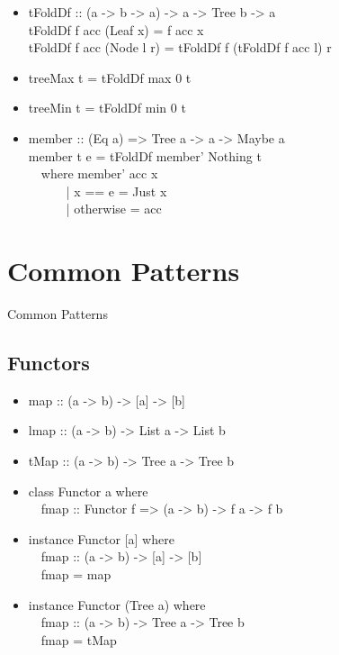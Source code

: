 \documentclass{beamer}                  %
\newcommand{\srule}{
	\rule{\textwidth}{1pt}\\
}
\newlength{\subsecwidth}
\newenvironment{slide}{
	\begin{frame} %
	\settowidth{\subsecwidth}{\insertsubsection} %
	\ifthenelse{\dimtest{\subsecwidth}{<}{1pt}}{ %
		\frametitle{\insertsection\\             %
		\vspace{-1ex}                            %
		\color{fore}\srule                       %
		\par                                     %
		\vspace{-3ex}                            %
		}
	}{                                           %
		\frametitle{\insertsection\ -- \insertsubsection\\ %
		\vspace{-1ex}                            %
		\color{fore}\srule                       %
		\par                                     %
		\vspace{-3ex}                            %
		}
	}
	\Large                                       %
}{
	\end{frame}
}
\newcommand{\titleslide}[1]{
	\section{#1}             %
	\begin{slide}
		\begin{center}
			\color{comments}
			\Huge            %
			#1               %
		\end{center}
	\end{slide}
}
\begin{document}
\begin{slide}
  \begin{itemize}
    \item
      tFoldDf :: (a -> b -> a) -> a -> Tree b -> a\\
      tFoldDf f acc (Leaf x)   = f acc x\\
      tFoldDf f acc (Node l r) = tFoldDf f (tFoldDf f acc l) r
    \item treeMax t = tFoldDf max 0 t
    \item treeMin t = tFoldDf min 0 t
  \end{itemize}
\end{slide}

\begin{slide}
  \begin{itemize}
    \item
      member :: (Eq a) => Tree a -> a -> Maybe a\\
      member t e = tFoldDf member' Nothing t\\
      ~~where member' acc x\\
      ~~~~~~| x == e    = Just x\\
      ~~~~~~| otherwise = acc

  \end{itemize}
\end{slide}

\titleslide{Common Patterns}
\subsection{Functors}

\begin{slide}
  \begin{itemize}
    \item map :: (a -> b) -> [a] -> [b]
    \item lmap :: (a -> b) -> List a -> List b
    \item tMap :: (a -> b) -> Tree a -> Tree b
  \end{itemize}
\end{slide}

\begin{slide}
  \begin{itemize}
    \item
      class Functor a where\\
      ~~fmap :: Functor f => (a -> b) -> f a -> f b
    \item
      instance Functor [a] where\\
      ~~fmap :: (a -> b) -> [a] -> [b]\\
      ~~fmap = map
    \item
      instance Functor (Tree a) where\\
      ~~fmap :: (a -> b) -> Tree a -> Tree b\\
      ~~fmap = tMap
  \end{itemize}
\end{slide}
\end{document}
